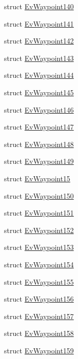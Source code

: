 \begin{DoxyCompactItemize}
struct \hyperlink{structcl__move__base__z_1_1EvWaypoint140}{Ev\+Waypoint140}
\item 
struct \hyperlink{structcl__move__base__z_1_1EvWaypoint141}{Ev\+Waypoint141}
\item 
struct \hyperlink{structcl__move__base__z_1_1EvWaypoint142}{Ev\+Waypoint142}
\item 
struct \hyperlink{structcl__move__base__z_1_1EvWaypoint143}{Ev\+Waypoint143}
\item 
struct \hyperlink{structcl__move__base__z_1_1EvWaypoint144}{Ev\+Waypoint144}
\item 
struct \hyperlink{structcl__move__base__z_1_1EvWaypoint145}{Ev\+Waypoint145}
\item 
struct \hyperlink{structcl__move__base__z_1_1EvWaypoint146}{Ev\+Waypoint146}
\item 
struct \hyperlink{structcl__move__base__z_1_1EvWaypoint147}{Ev\+Waypoint147}
\item 
struct \hyperlink{structcl__move__base__z_1_1EvWaypoint148}{Ev\+Waypoint148}
\item 
struct \hyperlink{structcl__move__base__z_1_1EvWaypoint149}{Ev\+Waypoint149}
\item 
struct \hyperlink{structcl__move__base__z_1_1EvWaypoint15}{Ev\+Waypoint15}
\item 
struct \hyperlink{structcl__move__base__z_1_1EvWaypoint150}{Ev\+Waypoint150}
\item 
struct \hyperlink{structcl__move__base__z_1_1EvWaypoint151}{Ev\+Waypoint151}
\item 
struct \hyperlink{structcl__move__base__z_1_1EvWaypoint152}{Ev\+Waypoint152}
\item 
struct \hyperlink{structcl__move__base__z_1_1EvWaypoint153}{Ev\+Waypoint153}
\item 
struct \hyperlink{structcl__move__base__z_1_1EvWaypoint154}{Ev\+Waypoint154}
\item 
struct \hyperlink{structcl__move__base__z_1_1EvWaypoint155}{Ev\+Waypoint155}
\item 
struct \hyperlink{structcl__move__base__z_1_1EvWaypoint156}{Ev\+Waypoint156}
\item 
struct \hyperlink{structcl__move__base__z_1_1EvWaypoint157}{Ev\+Waypoint157}
\item 
struct \hyperlink{structcl__move__base__z_1_1EvWaypoint158}{Ev\+Waypoint158}
\item 
struct \hyperlink{structcl__move__base__z_1_1EvWaypoint159}{Ev\+Waypoint159}
\item 

\end{DoxyCompactItemize}
